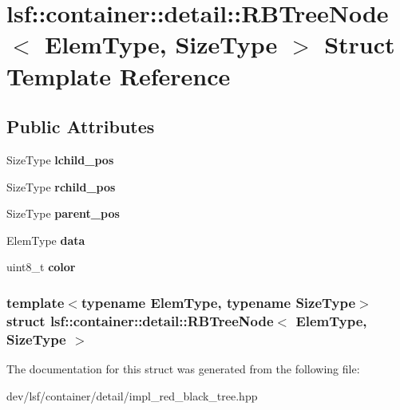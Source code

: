 \hypertarget{structlsf_1_1container_1_1detail_1_1RBTreeNode}{
\section{lsf::container::detail::RBTreeNode$<$ ElemType, SizeType $>$ Struct Template Reference}
\label{structlsf_1_1container_1_1detail_1_1RBTreeNode}
}
\subsection*{Public Attributes}
\begin{DoxyCompactItemize}
\item 
\hypertarget{structlsf_1_1container_1_1detail_1_1RBTreeNode_a33672c041087c528450038838150a521}{
SizeType {\bfseries lchild\_\-pos}}
\label{structlsf_1_1container_1_1detail_1_1RBTreeNode_a33672c041087c528450038838150a521}

\item 
\hypertarget{structlsf_1_1container_1_1detail_1_1RBTreeNode_a16ce879c65e479834e500823c1f3243e}{
SizeType {\bfseries rchild\_\-pos}}
\label{structlsf_1_1container_1_1detail_1_1RBTreeNode_a16ce879c65e479834e500823c1f3243e}

\item 
\hypertarget{structlsf_1_1container_1_1detail_1_1RBTreeNode_ac36167b7ae989702e5d8e1944513d8bd}{
SizeType {\bfseries parent\_\-pos}}
\label{structlsf_1_1container_1_1detail_1_1RBTreeNode_ac36167b7ae989702e5d8e1944513d8bd}

\item 
\hypertarget{structlsf_1_1container_1_1detail_1_1RBTreeNode_a34a38900cf7bf8b97695158edd73494c}{
ElemType {\bfseries data}}
\label{structlsf_1_1container_1_1detail_1_1RBTreeNode_a34a38900cf7bf8b97695158edd73494c}

\item 
\hypertarget{structlsf_1_1container_1_1detail_1_1RBTreeNode_a42348f4b69cfdef90d76089e0a3138ac}{
uint8\_\-t {\bfseries color}}
\label{structlsf_1_1container_1_1detail_1_1RBTreeNode_a42348f4b69cfdef90d76089e0a3138ac}

\end{DoxyCompactItemize}
\subsubsection*{template$<$typename ElemType, typename SizeType$>$ struct lsf::container::detail::RBTreeNode$<$ ElemType, SizeType $>$}



The documentation for this struct was generated from the following file:\begin{DoxyCompactItemize}
\item 
dev/lsf/container/detail/impl\_\-red\_\-black\_\-tree.hpp\end{DoxyCompactItemize}

